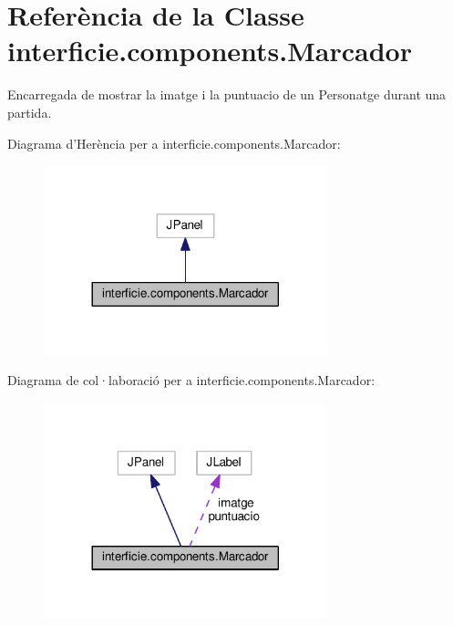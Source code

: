 \hypertarget{classinterficie_1_1components_1_1_marcador}{\section{Referència de la Classe interficie.\+components.\+Marcador}
\label{classinterficie_1_1components_1_1_marcador}
}


Encarregada de mostrar la imatge i la puntuacio de un Personatge durant una partida.  




Diagrama d'Herència per a interficie.\+components.\+Marcador\+:
\nopagebreak
\begin{figure}[H]
\begin{center}
\leavevmode
\includegraphics[width=233pt]{classinterficie_1_1components_1_1_marcador__inherit__graph}
\end{center}
\end{figure}


Diagrama de col·laboració per a interficie.\+components.\+Marcador\+:
\nopagebreak
\begin{figure}[H]
\begin{center}
\leavevmode
\includegraphics[width=233pt]{classinterficie_1_1components_1_1_marcador__coll__graph}
\end{center}
\end{figure}
